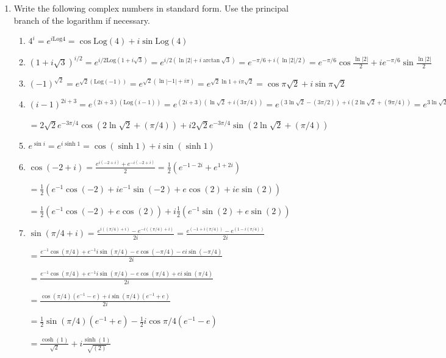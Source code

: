 \documentclass{article}
\begin{document}
\begin{enumerate}
	\item Write the following complex numbers in standard form. Use the principal branch of the logarithm if necessary.
	\begin{enumerate}
		\item $4^i = e^{i\text{Log}{4}}=\cos{\text{Log}(4)}+i\sin{\text{Log}(4)}$
		\item $(1+i\sqrt{3})^{i/2}=e^{i/2\text{Log}(1+i\sqrt{3})}=e^{i/2(\ln|2|+i\arctan{\sqrt{3}})}=e^{-\pi/6 + i(\ln|2|/2)}=e^{-\pi/6}\cos{\frac{\ln|2|}{2}}+ie^{-\pi/6}\sin{\frac{\ln|2|}{2}}$
		\item $(-1)^{\sqrt{2}}=e^{\sqrt{2}(\text{Log}(-1))}=e^{\sqrt{2}(\ln|-1|+i\pi)}=e^{\sqrt{2}\ln 1 + i\pi\sqrt{2}}=\cos{\pi\sqrt{2}}+i\sin{\pi\sqrt{2}}$
		\item $(i-1)^{2i+3}=e^{(2i+3)(\text{Log}(i-1))}=e^{ (2i+3) (\ln\sqrt{2}+i(3\pi/4)) } = e^{ (3\ln\sqrt{2}-(3\pi/2)) +i(2\ln\sqrt{2}+(9\pi/4)) }= e^{3\ln\sqrt{2}-(3\pi/2)} e^{2\ln\sqrt{2}+(9\pi/4)} = 2\sqrt{2}e^{-3\pi/2}e^{i(2\ln\sqrt{2}+(9\pi/4))}$
		
		$=2\sqrt{2}e^{-3\pi/4}\cos{(2\ln\sqrt{2}+(\pi/4))}+i2\sqrt{2}e^{-3\pi/4}\sin{(2\ln\sqrt{2}+(\pi/4))}$
		
		\item $e^{\sin{i}}=e^{i\sinh{1}}=\cos{(\sinh{1})}+i\sin{(\sinh{1})}$
		
		\item $\cos{(-2+i)}=\frac{e^{i(-2+i)}+e^{-i(-2+i)}}{2}=\frac{1}{2} (e^{-1-2i}+e^{1+2i}) $
		
		$=\frac{1}{2}(e^{-1}\cos{(-2)}+ie^{-1}\sin{(-2)}+e\cos{(2)}+ie\sin{(2)})$
		
		$=\frac{1}{2}(e^{-1}\cos{(-2)}+e\cos{(2)})+i\frac{1}{2}(e^{-1}\sin{(2)}+e\sin{(2)})$
		
		\item $\sin{(\pi/4 + i)}=\frac{ e^{i((\pi/4) + i)}-e^{-i((\pi/4) + i)} }{ 2i } = \frac{ e^{(-1 + i(\pi/4))}-e^{(1-i(\pi/4))} }{ 2i }$
		
		$= \frac{ e^{-1}\cos{(\pi/4)}+e^{-1}i\sin{(\pi/4)}-e\cos{(-\pi/4)}-ei\sin{(-\pi/4)} }{ 2i }$
		
		$= \frac{ e^{-1}\cos{(\pi/4)}+e^{-1}i\sin{(\pi/4)}-e\cos{(\pi/4)}+ei\sin{(\pi/4)} }{ 2i }$
		
		$= \frac{ \cos{(\pi/4)}(e^{-1}-e) + i\sin{(\pi/4)}(e^{-1}+e) }{ 2i } $
		
		$= \frac{1}{2}\sin{(\pi/4)}(e^{-1}+e)-\frac{1}{2}i\cos{\pi/4}(e^{-1}-e)$
		
		$= \frac{\cosh{(1)}}{\sqrt{2}}+i\frac{\sinh{(1)}}{\sqrt{(2)}}$
		

\end{enumerate}
\end{enumerate}
\end{document}
